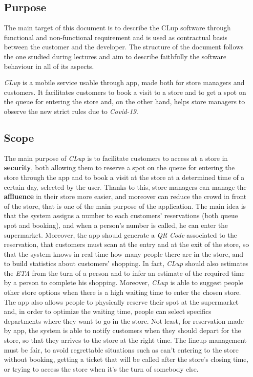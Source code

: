 \documentclass{article}
\begin{document}
	\subsection{Purpose}
	
	The main target of this document is to describe the CLup software through functional and non-functional requirement and is used as contractual basis between the customer and the developer. The structure of the document follows the one studied during lectures and aim to describe faithfully the software behaviour in all of its aspects.
	
	\emph{CLup} is a mobile service usable through app, made both for store managers and customers. It facilitates customers to book a visit to a store and to get a spot on the queue for entering the store and, on the other hand, helps store managers to observe the new strict rules due to \emph{Covid-19}.
	
	\subsection{Scope}
	
	The main purpose of \emph{CLup} is to facilitate customers to access at a store in {\bfseries security}, both allowing them to reserve a spot on the queue for entering the store through the app and to book a visit at the store at a determined time of a certain day, selected by the user. Thanks to this, store managers can manage the {\bfseries affluence} in their store more easier, and moreover can reduce the crowd in front of the store, that is one of the main purpose of the application. The main idea is that the system assigns a number to each customers' reservations (both queue spot and booking), and when a person's number is called, he can enter the supermarket. Moreover, the app should generate a \emph{QR Code} associated to the reservation, that customers must scan at the entry and at the exit of the store, so that the system knows in real time how many people there are in the store, and to build statistics about customers' shopping. In fact, \emph{CLup} should also estimates the \emph{ETA} from the turn of a person and to infer an estimate of the required time by a person to complete his shopping. Moreover, \emph{CLup} is able to suggest people other store options when there is a high waiting time to enter the chosen store. The app also allows people to physically reserve their spot at the supermarket and, in order to optimize the waiting time, people can select specifics departments where they want to go in the store. Not least, for reservation made by app, the system is able to notify customers when they should depart for the store, so that they arrives to the store at the right time. The lineup management must be fair, to avoid regrettable situations such as can't entering to the store without booking, getting a ticket that will be called after the store's closing time, or trying to access the store when it's the turn of somebody else.
\end{document}
